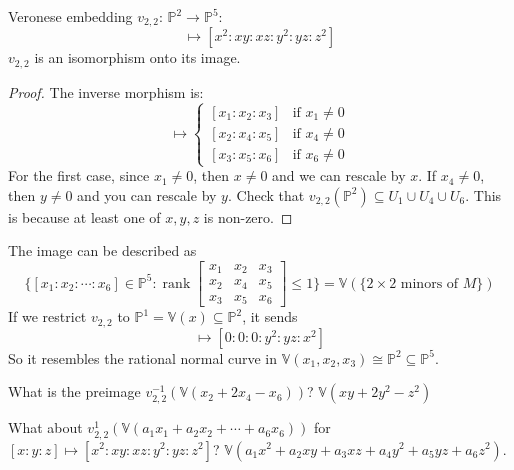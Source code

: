 \documentclass{report}
\begin{document}
Veronese embedding $v_{2, 2}$: $\mathbb{P}^{2} \rightarrow \mathbb{P}^{5}$:
    \begin{equation*}
        [x : y : z] \mapsto [x^{2} : xy : xz : y^{2} : yz : z^{2}]
    \end{equation*}
$ v_{2, 2}$ is an isomorphism onto its image.
    \begin{proof}
        The inverse morphism is:
            \begin{equation*}
                [x_{1} : x_{2} : x_{3} : x_{4} : x_{5} : x_{6}] \mapsto \begin{cases}
                    [x_{1} : x_{2} : x_{3}] &\text{if } x_{1} \neq 0 \\
                    [x_{2} : x_{4} : x_{5}] &\text{if } x_{4} \neq 0 \\
                    [x_{3} : x_{5} : x_{6}] &\text{if } x_{6} \neq 0   
                \end{cases}
            \end{equation*}
        For the first case, since $x_{1} \neq 0$, then $x \neq0$ and we can rescale by $x$. If $x_{4} \neq 0$, then $y \neq 0$ and you can rescale by $y$. Check that $v_{2, 2}(\mathbb{P}^{2}) \subseteq U_{1} \cup U_{4} \cup U_{6}$. This is because at least one of $x, y, z$ is non-zero.
    \end{proof}
The image can be described as 
    \begin{equation*}
        \{[x_{1} : x_{2}  : \cdots : x_{6}] \in \mathbb{P}^{5} : \mathop{rank}\begin{bmatrix}
            x_{1} & x_{2} & x_{3} \\
            x_{2} & x_{4} & x_{5} \\
            x_{3} & x_{5} & x_{6}   
        \end{bmatrix} \leq 1\} = \mathbb{V}(\{2 \times 2 \text{ minors of } M \})
    \end{equation*}
If we restrict $v_{2, 2}$ to $\mathbb{P}^{1} = \mathbb{V}(x) \subseteq \mathbb{P}^{2}$, it sends 
    \begin{equation*}
        [0 : y : z] \mapsto [0 : 0 : 0 : y^{2} : yz : x^{2}]
    \end{equation*}
So it resembles the rational normal curve in $\mathbb{V}(x_{1}, x_{2}, x_{3}) \cong \mathbb{P}^{2} \subseteq \mathbb{P}^{5}$.

What is the preimage $v_{2, 2}^{-1}(\mathbb{V}(x_{2} + 2x_{4} - x_{6}))$? $\mathbb{V}(xy + 2y^{2} - z^{2})$

What about $v_{2,2}^{1}(\mathbb{V}(a_{1}x_{1} + a_{2}x_{2} + \cdots + a_{6}x_{6}))$ for $[x : y : z] \mapsto [x^{2} : xy : xz : y^{2} : yz : z^{2}]$? $\mathbb{V}(a_{1}x^{2} + a_{2}xy + a_{3}xz + a_{4}y^{2} + a_{5}yz + a_{6}z^{2})$.
\end{document}

